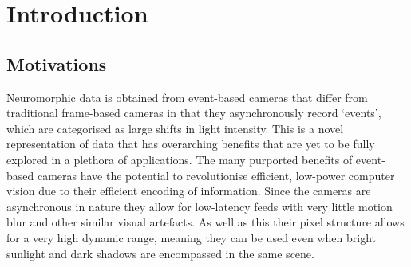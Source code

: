 \chapter{Introduction} \setcounter{page}{1}

\section{Motivations}

Neuromorphic data is obtained from event-based cameras that differ from traditional frame-based cameras in that they asynchronously record `events', which are categorised as large shifts in light intensity. This is a novel representation of data that has overarching benefits that are yet to be fully explored in a plethora of applications. The many purported benefits of event-based cameras have the potential to revolutionise efficient, low-power computer vision due to their efficient encoding of information. Since the cameras are asynchronous in nature they allow for low-latency feeds with very little motion blur and other similar visual artefacts. As well as this their pixel structure allows for a very high dynamic range, meaning they can be used even when bright sunlight and dark shadows are encompassed in the same scene.

